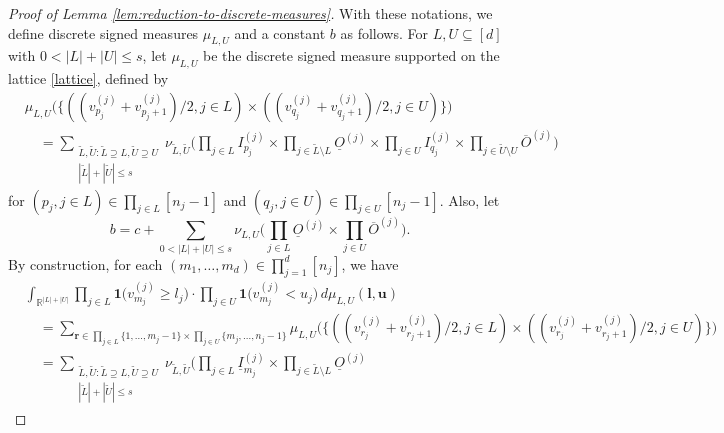 \documentclass[10pt]{article}
\newcommand{\R}{{\mathbb R}}
\newcommand{\lbf}{{\mathbf{l}}}
\newcommand{\ubf}{{\mathbf{u}}}
\newcommand{\rbf}{{\mathbf{r}}}
\newcommand{\ind}{{\mathbf{1}}}
\begin{document}
\begin{proof}[Proof of Lemma \ref{lem:reduction-to-discrete-measures}]
With these notations, we define discrete signed measures 
$\mu_{L, U}$ and a constant $b$ as follows.
For $L, U \subseteq [d]$ with $0 < |L| + |U| \le s$, let 
$\mu_{L, U}$ be the discrete signed measure 
supported on the lattice \eqref{lattice}, defined by
\begin{equation*}
\begin{aligned}
    &\mu_{L, U} \big(\{(
    (v^{(j)}_{p_j} + v^{(j)}_{p_j + 1})/2, j \in L) 
    \times ((v^{(j)}_{q_j} + v^{(j)}_{q_j + 1})/2, j \in U)\}\big) \\
    &\quad= \sum_{\substack{\widetilde{L}, \widetilde{U}: 
    \widetilde{L} \supseteq L, \widetilde{U} \supseteq U \\
    |\widetilde{L}| + |\widetilde{U}| \le s}}
    \nu_{\widetilde{L}, \widetilde{U}} 
    \Big(\prod_{j \in L} I^{(j)}_{p_j} 
    \times \prod_{j \in \widetilde{L} \setminus L} \underline{O}^{(j)} 
    \times \prod_{j \in U} I^{(j)}_{q_j}
    \times \prod_{j \in \widetilde{U} \setminus U} 
    \overline{O}^{(j)}\Big)
\end{aligned}
\end{equation*}
for $(p_j, j \in L) \in \prod_{j \in L} [n_j - 1]$ and 
$(q_j, j \in U) \in \prod_{j \in U} [n_j - 1]$.
Also, let
\begin{equation*}
    b = c + \sum_{0 < |L| + |U| \le s} \nu_{L, U} 
    \Big(\prod_{j \in L} \underline{O}^{(j)} 
    \times \prod_{j \in U} \overline{O}^{(j)}\Big).
\end{equation*}
By construction, for each $(m_1, \dots, m_d) 
\in \prod_{j = 1}^{d} [n_j]$, we have
\begin{equation*}
\begin{aligned}
    &\int_{\R^{|L| + |U|}} \prod_{j \in L} 
    \ind\big(v^{(j)}_{m_j} \ge l_j\big)  
    \cdot \prod_{j \in U} \ind\big(v^{(j)}_{m_j} < u_j\big)
    \, d\mu_{L, U}(\lbf, \ubf) \\
    &\quad = 
    \sum_{\rbf \in \prod\limits_{j \in L} \{1, \dots, m_j - 1\}
    \times \prod\limits_{j \in U} \{m_j, \dots, n_j - 1\}} 
    \mu_{L, U} \big(\{((v^{(j)}_{r_j} + v^{(j)}_{r_j + 1})/2, j \in L) 
    \times ((v^{(j)}_{r_j} + v^{(j)}_{r_j + 1})/2, j \in U)\}\big) \\
    &\quad= \sum_{\substack{\widetilde{L}, \widetilde{U}: 
    \widetilde{L} \supseteq L, \widetilde{U} \supseteq U \\
    |\widetilde{L}| + |\widetilde{U}| \le s}}
    \nu_{\widetilde{L}, \widetilde{U}} 
    \Big(\prod_{j \in L} \underline{I}^{(j)}_{m_j} 
    \times \prod_{j \in \widetilde{L} \setminus L} \underline{O}^{(j)} 

\end{aligned}
\end{equation*}
\end{proof}
\end{document}
